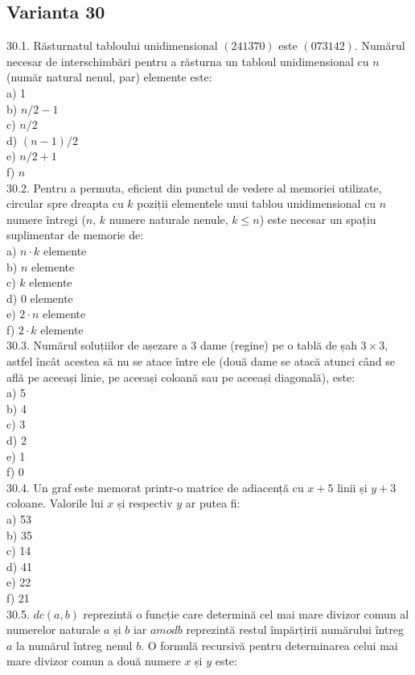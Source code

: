 \begin{itemize}
\section*{Varianta 30}

30.1. Răsturnatul tabloului unidimensional $(2 4 1 3 7 0)$ este $(0 7 3 1 4 2)$.
Numărul necesar de interschimbări pentru a răsturna un tabloul unidimensional cu $n$ (număr natural nenul, par) elemente este:
\\
a) 1\\
b) $n/2-1$
\\
c) $n/2$
\\
d) $(n-1)/2$
\\
e) $n/2+1$
\\
f) $n$
\\
30.2. Pentru a permuta, eficient din punctul de vedere al memoriei utilizate, circular spre dreapta cu $k$ poziții elementele unui tablou unidimensional cu $n$ numere întregi ($n$, $k$ numere naturale nenule, $k \leq n$) este necesar un spațiu suplimentar de memorie de:
\\
a) $n \cdot k$ elemente
\\
b) $n$ elemente
\\
c) $k$ elemente
\\
d) $0$ elemente
\\
e) $2 \cdot n$ elemente
\\
f) $2 \cdot k$ elemente
\\
30.3. Numărul soluțiilor de așezare a 3 dame (regine) pe o tablă de șah $3 \times 3$, astfel încât acestea să nu se atace între ele (două dame se atacă atunci când se află pe aceeași linie, pe aceeași coloană sau pe aceeași diagonală), este:
\\
a) 5
\\
b) 4
\\
c) 3
\\
d) 2
\\
e) 1
\\
f) 0
\\
30.4. Un graf este memorat printr-o matrice de adiacență cu $x+5$ linii și $y+3$ coloane. Valorile lui $x$ și respectiv $y$ ar putea fi:
\\
a) 53
\\
b) 35
\\
c) 14
\\
d) 41
\\
e) 22
\\
f) 21
\\
30.5. $dc(a, b)$ reprezintă o funcție care determină cel mai mare divizor comun al numerelor naturale $a$ și $b$ iar $a mod b$ reprezintă restul împărțirii numărului întreg $a$ la numărul întreg nenul $b$. O formulă recursivă pentru determinarea celui mai mare divizor comun a două numere $x$ și $y$ este:

\end{itemize}

